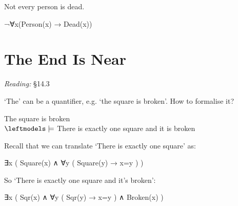 \documentclass[12pt]{extarticle}
\begin{document}
\begin{multicols*}{3}
Not every person is dead.
 
\hspace{5mm} ¬∀x(Person(x) → Dead(x))
 
 
 
\section{The End Is Near}
 
\emph{Reading:} §14.3
 
‘The’ can be a quantifier, e.g. ‘the square is broken’. How to formalise it?
 
The square is broken
\\ 
$\leftmodels\models$ There is exactly one square and it is broken
 
Recall that we can translate `There is exactly one square' as:
 
\hspace{5mm} ∃x ( Square(x) ∧ ∀y ( Square(y) → x=y ) )
 
So `There is exactly one square and it's broken':
 
∃x ( Sqr(x) ∧ ∀y ( Sqr(y) → x=y ) ∧ Broken(x) )
 
\vfill

 


\end{multicols*}
\end{document}
